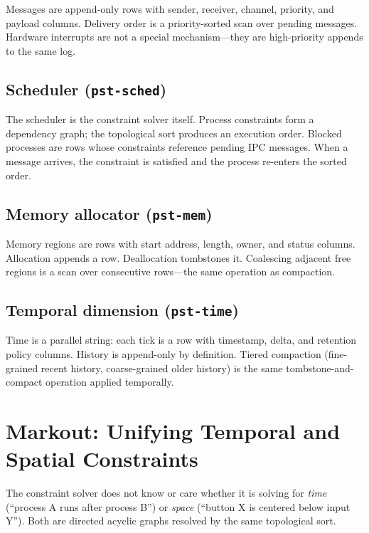 \documentclass[11pt,a4paper]{article}
\begin{document}
Messages are append-only rows with sender, receiver, channel, priority, and payload columns. Delivery order is a priority-sorted scan over pending messages. Hardware interrupts are not a special mechanism---they are high-priority appends to the same log.

\subsection{Scheduler (\texttt{pst-sched})}

The scheduler is the constraint solver itself. Process constraints form a dependency graph; the topological sort produces an execution order. Blocked processes are rows whose constraints reference pending IPC messages. When a message arrives, the constraint is satisfied and the process re-enters the sorted order.

\subsection{Memory allocator (\texttt{pst-mem})}

Memory regions are rows with start address, length, owner, and status columns. Allocation appends a row. Deallocation tombstones it. Coalescing adjacent free regions is a scan over consecutive rows---the same operation as compaction.

\subsection{Temporal dimension (\texttt{pst-time})}

Time is a parallel string: each tick is a row with timestamp, delta, and retention policy columns. History is append-only by definition. Tiered compaction (fine-grained recent history, coarse-grained older history) is the same tombstone-and-compact operation applied temporally.

\section{Markout: Unifying Temporal and Spatial Constraints}
\label{sec:markout}

The constraint solver does not know or care whether it is solving for \emph{time} (``process A runs after process B'') or \emph{space} (``button X is centered below input Y''). Both are directed acyclic graphs resolved by the same topological sort.
\end{document}
